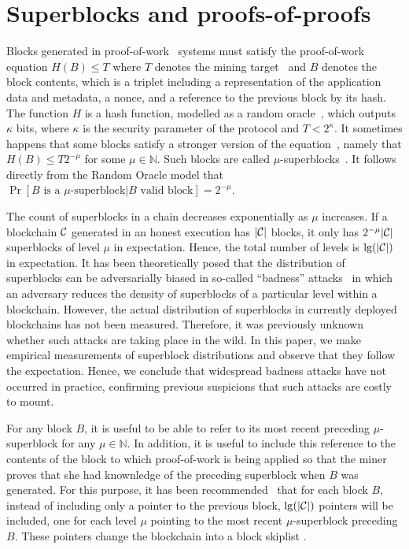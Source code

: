 \section{Superblocks and proofs-of-proofs}

Blocks generated in proof-of-work~\cite{C:DwoNao92} systems must satisfy the
proof-of-work equation $H(B) \leq T$ where $T$ denotes the mining
target~\cite{SP:BMCNKF15} and $B$ denotes the block contents, which is a triplet
including a representation of the application data and metadata, a nonce, and a
reference to the previous block by its hash. The function $H$ is a hash
function, modelled as a random oracle~\cite{CCS:BelRog93}, which outputs
$\kappa$ bits, where $\kappa$ is the security parameter of the protocol and $T <
2^\kappa$. It sometimes happens that some blocks satisfy a stronger version of
the equation~\cite{popow}, namely that $H(B) \leq T2^{-\mu}$ for some $\mu \in
\mathbb{N}$. Such blocks are called $\mu$-superblocks~\cite{nipopows}.
It follows directly from the Random Oracle model that
$\Pr[B \text{ is a } \mu\text{-superblock}|B \text{ valid block}] = 2^{-\mu}$.

The count of superblocks in a chain decreases exponentially as $\mu$ increases.
If a blockchain $\mathcal{C}$ generated in an honest execution has $|\mathcal{C}|$ blocks,
it only has $2^{-\mu}|\mathcal{C}|$ superblocks of level $\mu$ in expectation. Hence,
the total number of levels is $\lg(|\mathcal{C}|)$ in expectation. It has been
theoretically posed that the distribution of superblocks can be adversarially
biased in so-called ``badness'' attacks~\cite{nipopows} in which an adversary
reduces the density of superblocks of a particular level within a blockchain.
However, the actual distribution of superblocks in currently deployed
blockchains has not been measured. Therefore, it was previously unknown whether
such attacks are taking place in the wild. In this paper, we make empirical
measurements of superblock distributions and observe that they follow the
expectation. Hence, we conclude that widespread badness attacks have not
occurred in practice, confirming previous suspicions that such attacks are
costly to mount.

For any block $B$,
it is useful to be able to refer to its most recent preceding $\mu$-superblock
for any $\mu \in \mathbb{N}$. In addition, it is useful to include this
reference to the contents of the block to which proof-of-work is being applied
so that the miner proves that she had knownledge of the preceding superblock
when $B$ was generated. For this purpose, it has been
recommended~\cite{nipopows} that for each block $B$, instead of including only a
pointer to the previous block, $\lg(|\mathcal{C}|)$ pointers will be included, one
for each level $\mu$ pointing to the most recent $\mu$-superblock preceding $B$.
These pointers change the blockchain into a block skiplist .

